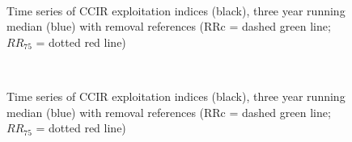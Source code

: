 \documentclass[11pt]{article}
\newcommand{\e}{/backup/bio_data/bio.lobster/figures/} %
\begin{document}
\begin{figure}
        \centering
         \\
                    \caption{Time series of CCIR exploitation indices (black), three year running median (blue) with removal references (RRc = dashed green line; $RR_{75}$ = dotted red line)}
        \end{figure}


\begin{figure}
        \centering
         \\
                    \caption{Time series of CCIR exploitation indices (black), three year running median (blue) with removal references (RRc = dashed green line; $RR_{75}$ = dotted red line)}
        \end{figure}
\end{document}
